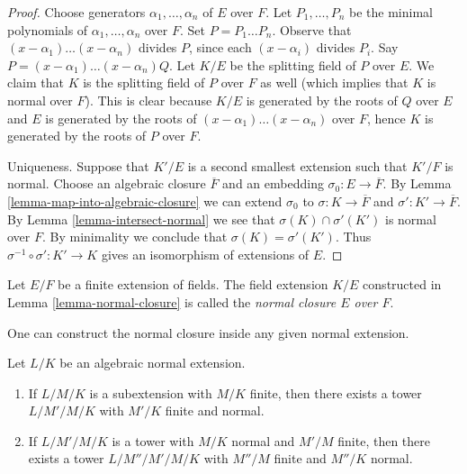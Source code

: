 \begin{proof}
Choose generators $\alpha_1, \ldots, \alpha_n$ of $E$ over $F$.
Let $P_1, \ldots, P_n$ be the minimal polynomials of
$\alpha_1, \ldots, \alpha_n$ over $F$. Set $P = P_1 \ldots P_n$.
Observe that $(x - \alpha_1) \ldots (x - \alpha_n)$ divides $P$, since
each $(x - \alpha_i)$ divides $P_i$. Say
$P = (x - \alpha_1) \ldots (x - \alpha_n)Q$.
Let $K/E$ be the splitting field of $P$ over $E$.
We claim that $K$ is the splitting field of $P$ over $F$ as well
(which implies that $K$ is normal over $F$).
This is clear because $K/E$ is generated by the roots of
$Q$ over $E$ and $E$ is generated by the roots of
$(x - \alpha_1) \ldots (x - \alpha_n)$ over $F$, hence
$K$ is generated by the roots of $P$ over $F$.

\medskip\noindent
Uniqueness. Suppose that $K'/E$ is a second smallest extension such that
$K'/F$ is normal. Choose an algebraic closure $\overline{F}$ and an
embedding $\sigma_0 : E \to \overline{F}$. By
Lemma \ref{lemma-map-into-algebraic-closure}
we can extend $\sigma_0$ to $\sigma : K \to \overline{F}$ and
$\sigma' : K' \to \overline{F}$.
By Lemma \ref{lemma-intersect-normal} we see that
$\sigma(K) \cap \sigma'(K')$ is normal over $F$.
By minimality we conclude that $\sigma(K) = \sigma'(K')$.
Thus $\sigma^{-1} \circ \sigma' : K' \to K$ gives an isomorphism
of extensions of $E$.
\end{proof}

\begin{definition}
\label{definition-normal-closure}
Let $E/F$ be a finite extension of fields. The field extension $K/E$
constructed in Lemma \ref{lemma-normal-closure}
is called the {\it normal closure $E$ over $F$}.
\end{definition}

\noindent
One can construct the normal closure inside any given normal extension.

\begin{lemma}
\label{lemma-normal-closure-inside-normal}
Let $L/K$ be an algebraic normal extension.
\begin{enumerate}
\item If $L/M/K$ is a subextension with $M/K$ finite, then there exists
a tower $L/M'/M/K$ with $M'/K$ finite and normal.
\item If $L/M'/M/K$ is a tower with $M/K$ normal and $M'/M$ finite,
then there exists a tower $L/M''/M'/M/K$ with $M''/M$
finite and $M''/K$ normal.
\end{enumerate}
\end{lemma}

